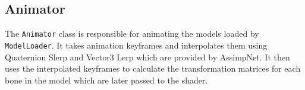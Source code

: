 \subsection{Animator}

The \texttt{Animator} class is responsible for animating the models loaded by \texttt{ModelLoader}.
It takes animation keyframes and interpolates them using Quaternion Slerp and Vector3 Lerp which are provided by AssimpNet.
It then uses the interpolated keyframes to calculate the transformation matrices for each bone in the model which are later passed to the shader.